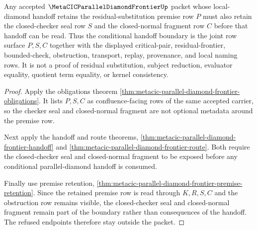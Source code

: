 \begin{theorem}
\label{thm:metacic-parallel-diamond-closed-checker-retention}
Any accepted $\MetaCICParallelDiamondFrontierUp$ packet whose local-diamond handoff retains the residual-substitution premise row $P$ must also retain the closed-checker seal row $S$ and the closed-normal fragment row $C$ before that handoff can be read. Thus the conditional handoff boundary is the joint row surface $P,S,C$ together with the displayed critical-pair, residual-frontier, bounded-check, obstruction, transport, replay, provenance, and local naming rows. It is not a proof of residual substitution, subject reduction, evaluator equality, quotient term equality, or kernel consistency.
\end{theorem}
\begin{proof}
Apply the obligations theorem \autoref{thm:metacic-parallel-diamond-frontier-obligations}. It lists $P,S,C$ as confluence-facing rows of the same accepted carrier, so the checker seal and closed-normal fragment are not optional metadata around the premise row.

Next apply the handoff and route theorems, \autoref{thm:metacic-parallel-diamond-frontier-handoff} and \autoref{thm:metacic-parallel-diamond-frontier-route}. Both require the closed-checker seal and closed-normal fragment to be exposed before any conditional parallel-diamond handoff is consumed.

Finally use premise retention, \autoref{thm:metacic-parallel-diamond-frontier-premise-retention}. Since the retained premise row is read through $K,R,S,C$ and the obstruction row remains visible, the closed-checker seal and closed-normal fragment remain part of the boundary rather than consequences of the handoff. The refused endpoints therefore stay outside the packet.
\end{proof}


